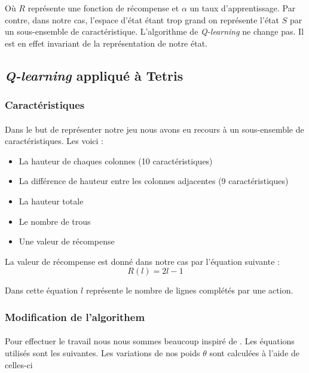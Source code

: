 \documentclass[a4paper, 12pt]{article} %
\begin{document}
	Où $R$ représente une fonction de récompense et $\alpha$ un taux d'apprentissage. Par contre, dans notre cas,
	l'espace d'état étant trop grand on représente l'état $S$ par un sous-ensemble de caractéristique. L'algorithme
	de \textit{Q-learning} ne change pas. Il est en effet invariant de la représentation de notre état. 

    \subsection{\textit{Q-learning} appliqué à Tetris}
    	\subsubsection{Caractéristiques}
    	    \paragraph{}
	    Dans le but de représenter notre jeu nous avons eu recours à un sous-ensemble de caractéristiques. Les voici :
	    \begin{itemize}
	    	\item La hauteur de chaques colonnes (10 caractéristiques)
		\item La différence de hauteur entre les colonnes adjacentes (9 caractéristiques)
		\item La hauteur totale
		\item Le nombre de trous 
		\item Une valeur de récompense
	    \end{itemize}

	    La valeur de récompense est donné dans notre cas par l'équation suivante :
	    \begin{equation}
	    \label{recompense}
	    	R(l) = 2l - 1
	    \end{equation}
	    
	    Dans cette équation $l$ représente le nombre de lignes complétés par une action.

	\subsubsection{Modification de l'algorithem}
    	    \paragraph{}
	    Pour effectuer le travail nous nous sommes beaucoup inspiré de \cite{tetris}. Les équations utilisés sont les 
	    suivantes. Les variations de nos poids $\theta$ sont calculées à l'aide de celles-ci
\end{document}

